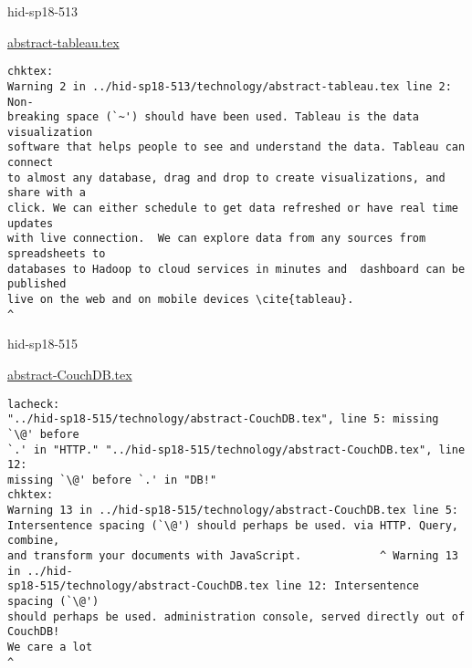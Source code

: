 \begin{IU}

hid-sp18-513

\href{https://github.com/cloudmesh-community/hid-sp18-513/blob/master//technology/abstract-tableau.tex}{abstract-tableau.tex}

\begin{tiny}
\begin{verbatim}
chktex:
Warning 2 in ../hid-sp18-513/technology/abstract-tableau.tex line 2: Non-
breaking space (`~') should have been used. Tableau is the data visualization
software that helps people to see and understand the data. Tableau can connect
to almost any database, drag and drop to create visualizations, and share with a
click. We can either schedule to get data refreshed or have real time updates
with live connection.  We can explore data from any sources from spreadsheets to
databases to Hadoop to cloud services in minutes and  dashboard can be published
live on the web and on mobile devices \cite{tableau}.
^
\end{verbatim}
\end{tiny}
\end{IU}



\begin{IU}

hid-sp18-515

\href{https://github.com/cloudmesh-community/hid-sp18-515/blob/master//technology/abstract-CouchDB.tex}{abstract-CouchDB.tex}

\begin{tiny}
\begin{verbatim}
lacheck:
"../hid-sp18-515/technology/abstract-CouchDB.tex", line 5: missing `\@' before
`.' in "HTTP." "../hid-sp18-515/technology/abstract-CouchDB.tex", line 12:
missing `\@' before `.' in "DB!"
chktex:
Warning 13 in ../hid-sp18-515/technology/abstract-CouchDB.tex line 5:
Intersentence spacing (`\@') should perhaps be used. via HTTP. Query, combine,
and transform your documents with JavaScript.            ^ Warning 13 in ../hid-
sp18-515/technology/abstract-CouchDB.tex line 12: Intersentence spacing (`\@')
should perhaps be used. administration console, served directly out of CouchDB!
We care a lot                                                          ^
\end{verbatim}
\end{tiny}
\end{IU}

